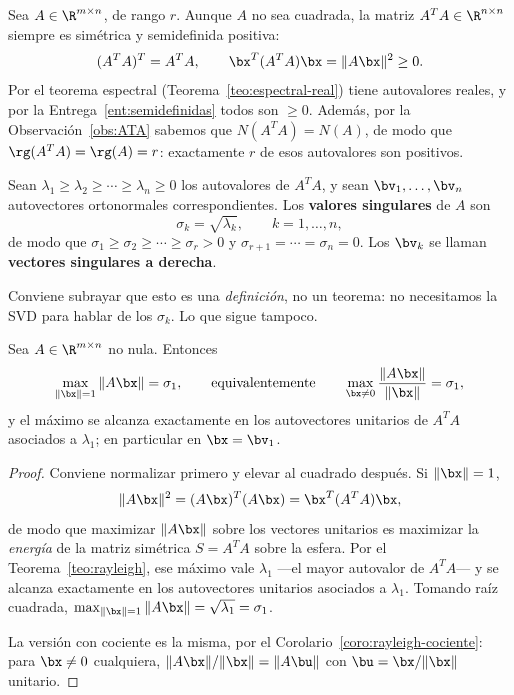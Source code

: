 Sea $A\in\R^{m\times n}$, de rango $r$. Aunque $A$ no sea cuadrada, la matriz
$A^TA\in\R^{n\times n}$ siempre es simétrica y semidefinida positiva:
\[
(A^TA)^T=A^TA,
\qquad
\bx^T(A^TA)\bx=\|A\bx\|^2\ge0 .
\]
Por el teorema espectral (Teorema~\ref{teo:espectral-real}) tiene autovalores
reales, y por la Entrega~\ref{ent:semidefinidas} todos son $\ge0$. Además,
por la Observación~\ref{obs:ATA} sabemos que $N(A^TA)=N(A)$, de modo que
$\rg(A^TA)=\rg(A)=r$: exactamente $r$ de esos autovalores son positivos.

\begin{definition}\label{def:valores-singulares}
Sean $\lambda_1\ge\lambda_2\ge\cdots\ge\lambda_n\ge0$ los autovalores de
$A^TA$, y sean $\bv_1,\dots,\bv_n$ autovectores ortonormales
correspondientes. Los \textbf{valores singulares} de $A$ son
\[
\sigma_k=\sqrt{\lambda_k},\qquad k=1,\dots,n,
\]
de modo que $\sigma_1\ge\sigma_2\ge\cdots\ge\sigma_r>0$ y
$\sigma_{r+1}=\cdots=\sigma_n=0$. Los $\bv_k$ se llaman \textbf{vectores
singulares a derecha}.
\end{definition}

Conviene subrayar que esto es una \emph{definición}, no un teorema: no
necesitamos la SVD para hablar de los $\sigma_k$. Lo que sigue tampoco.

\begin{theorem}\label{teo:sigma1}
Sea $A\in\R^{m\times n}$ no nula. Entonces
\[
\max_{\|\bx\|=1}\|A\bx\| = \sigma_1 ,
\qquad\text{equivalentemente}\qquad
\max_{\bx\neq0}\frac{\|A\bx\|}{\|\bx\|}=\sigma_1 ,
\]
y el máximo se alcanza exactamente en los autovectores unitarios de $A^TA$
asociados a $\lambda_1$; en particular en $\bx=\bv_1$.
\end{theorem}

\begin{proof}
Conviene normalizar primero y elevar al cuadrado después. Si $\|\bx\|=1$,
\[
\|A\bx\|^2=(A\bx)^T(A\bx)=\bx^T(A^TA)\bx ,
\]
de modo que maximizar $\|A\bx\|$ sobre los vectores unitarios es maximizar la
\emph{energía} de la matriz simétrica $S=A^TA$ sobre la esfera. Por el
Teorema~\ref{teo:rayleigh}, ese máximo vale $\lambda_1$ ---el mayor autovalor
de $A^TA$--- y se alcanza exactamente en los autovectores unitarios asociados
a $\lambda_1$. Tomando raíz cuadrada,
$\max_{\|\bx\|=1}\|A\bx\|=\sqrt{\lambda_1}=\sigma_1$.

La versión con cociente es la misma, por el
Corolario~\ref{coro:rayleigh-cociente}: para $\bx\neq0$ cualquiera,
$\|A\bx\|/\|\bx\|=\|A\bu\|$ con $\bu=\bx/\|\bx\|$ unitario.
\end{proof}

